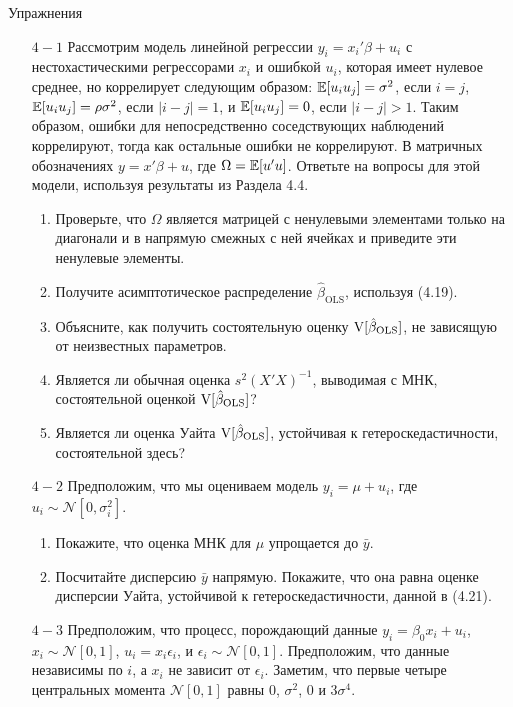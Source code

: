 \begin{center}
Упражнения
\end{center} 
\begin{small}
\begin{enumerate}
\item [$4-1$] Рассмотрим модель линейной регрессии $y_i = x_i'\beta +u_i$ с нестохастическими регрессорами $x_i$ и ошибкой $u_i$, которая имеет нулевое среднее, но коррелирует следующим образом: $\mathbb{E}[u_i u_j] = \sigma^2$, если $i=j$, $\mathbb{E}[u_i u_j] = \rho \sigma^2$, если $|i-j|=1$, и $\mathbb{E}[u_i u_j] = 0$, если $|i-j|>1$. Таким образом, ошибки для непосредственно соседствующих наблюдений коррелируют, тогда как остальные ошибки не коррелируют. В матричных обозначениях $y = x'\beta +u$, где $\Omega = \mathbb{E} [u'u]$. Ответьте на вопросы для этой модели, используя результаты из Раздела 4.4.
\begin{enumerate}
\item Проверьте, что  $\Omega$ является  матрицей с ненулевыми элементами только на диагонали и в напрямую смежных с ней ячейках и приведите эти ненулевые элементы. 
\item Получите асимптотическое распределение $\hat{\beta}_{\text{OLS}}$, используя (4.19).
\item Объясните, как получить состоятельную оценку $\mathrm{V}[\hat{\beta}_{\text{OLS}}]$, не зависящую от неизвестных параметров.
\item Является ли обычная оценка $s^2 (X'X)^{-1}$, выводимая с МНК, состоятельной оценкой $\mathrm{V}[\hat{\beta}_{\text{OLS}}]$?
\item Является ли оценка Уайта $\mathrm{V}[\hat{\beta}_{\text{OLS}}]$, устойчивая к гетероскедастичности, состоятельной здесь?
\end{enumerate}
\item [$4-2$] Предположим, что мы оцениваем модель $y_i = \mu + u_i$, где $u_i \sim \mathcal{N}[0,\sigma^2_i]$.
\begin{enumerate}
\item Покажите, что оценка МНК для $\mu$ упрощается до $\bar{y}$.
\item Посчитайте дисперсию $\bar{y}$ напрямую. Покажите, что она равна оценке дисперсии Уайта, устойчивой к гетероскедастичности, данной в (4.21). 
\end{enumerate}
\item [$4-3$] Предположим, что процесс, порождающий данные $y_i = \beta_0 x_i + u_i$, $x_i \sim \mathcal{N}[0,1]$, $u_i = x_i \epsilon_i$, и $\epsilon_i \sim \mathcal{N}[0,1]$. Предположим, что данные независимы по $i$, а $x_i$ не зависит от $\epsilon_i$. Заметим, что первые четыре центральных момента $\mathcal{N}[0,1]$ равны $0$, $\sigma^2$, $0$ и $3 \sigma^4$.

\end{enumerate}
\end{small}
